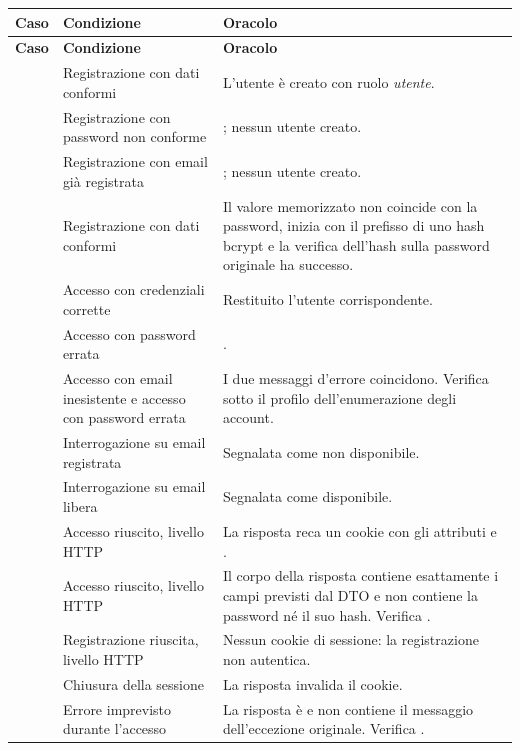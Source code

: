 \begin{longtable}{@{}l L{5.0cm} L{7.4cm}@{}}
\toprule
\textbf{Caso} & \textbf{Condizione} & \textbf{Oracolo} \\
\midrule
\endfirsthead
\toprule
\textbf{Caso} & \textbf{Condizione} & \textbf{Oracolo} \\
\midrule
\endhead
\bottomrule
\endlastfoot

 & Registrazione con dati conformi &
L'utente è creato con ruolo \emph{utente}. \\

 & Registrazione con password non conforme &
; nessun utente creato. \\

 & Registrazione con email già registrata &
; nessun utente creato. \\

 & Registrazione con dati conformi &
Il valore memorizzato non coincide con la password, inizia con il prefisso
di uno hash bcrypt e la verifica dell'hash sulla password originale ha
successo. \\

 & Accesso con credenziali corrette &
Restituito l'utente corrispondente. \\

 & Accesso con password errata &
. \\

 & Accesso con email inesistente e accesso con password errata &
I due messaggi d'errore coincidono. Verifica  sotto il profilo
dell'enumerazione degli account. \\

 & Interrogazione su email registrata &
Segnalata come non disponibile. \\

 & Interrogazione su email libera &
Segnalata come disponibile. \\

 & Accesso riuscito, livello HTTP &
La risposta reca un cookie con gli attributi  e
. \\

 & Accesso riuscito, livello HTTP &
Il corpo della risposta contiene esattamente i campi previsti dal DTO e non
contiene la password né il suo hash. Verifica . \\

 & Registrazione riuscita, livello HTTP &
Nessun cookie di sessione: la registrazione non autentica. \\

 & Chiusura della sessione &
La risposta invalida il cookie. \\

 & Errore imprevisto durante l'accesso &
La risposta è  e non contiene il messaggio dell'eccezione originale.
Verifica . \\

\end{longtable}

